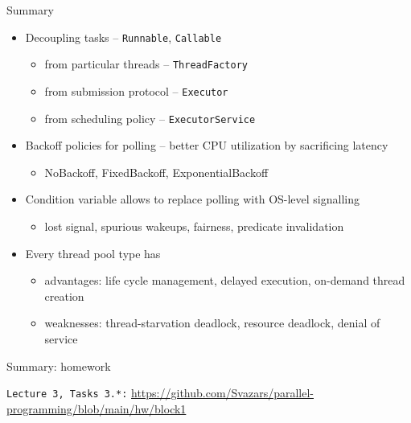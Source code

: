 \begin{frame}{Summary}
\begin{itemize}
    \item Decoupling tasks -- \texttt{Runnable}, \texttt{Callable}
        \begin{itemize}
            \item from particular threads  -- \texttt{ThreadFactory}
            \item from submission protocol -- \texttt{Executor}
            \item from scheduling policy   -- \texttt{ExecutorService}
        \end{itemize}
    \item Backoff policies for polling -- better CPU utilization by sacrificing latency
        \begin{itemize}
            \item NoBackoff, FixedBackoff, ExponentialBackoff
        \end{itemize}
    \item Condition variable allows to replace polling with OS-level signalling
        \begin{itemize}
            \item lost signal, spurious wakeups, fairness, predicate invalidation
        \end{itemize}
    \item Every thread pool type has
        \begin{itemize}
            \item advantages: life cycle management, delayed execution, on-demand thread creation
            \item weaknesses: thread-starvation deadlock, resource deadlock, denial of service
        \end{itemize}
\end{itemize}
\end{frame}

\begin{frame}{Summary: homework}

\texttt{Lecture 3, Tasks 3.*:} {\tiny\url{https://github.com/Svazars/parallel-programming/blob/main/hw/block1}}

\end{frame}





